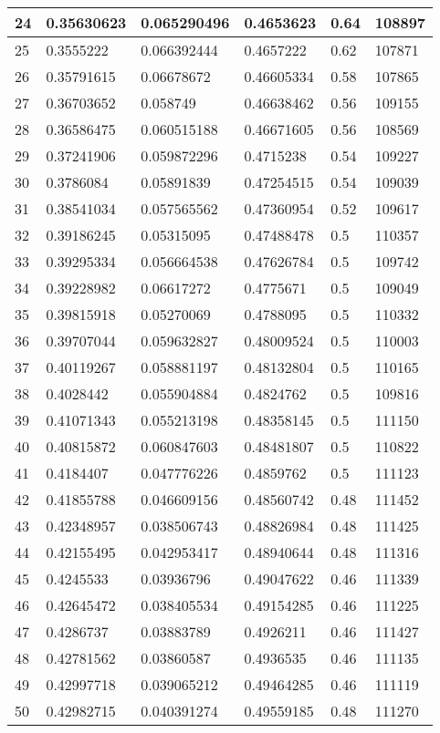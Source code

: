 \begin{longtable}{|l|l|l|l|l|l|}
24 & 0.35630623 & 0.065290496 & 0.4653623 & 0.64 & 108897 \\ \hline 
25 & 0.3555222 & 0.066392444 & 0.4657222 & 0.62 & 107871 \\ \hline 
26 & 0.35791615 & 0.06678672 & 0.46605334 & 0.58 & 107865 \\ \hline 
27 & 0.36703652 & 0.058749 & 0.46638462 & 0.56 & 109155 \\ \hline 
28 & 0.36586475 & 0.060515188 & 0.46671605 & 0.56 & 108569 \\ \hline 
29 & 0.37241906 & 0.059872296 & 0.4715238 & 0.54 & 109227 \\ \hline 
30 & 0.3786084 & 0.05891839 & 0.47254515 & 0.54 & 109039 \\ \hline 
31 & 0.38541034 & 0.057565562 & 0.47360954 & 0.52 & 109617 \\ \hline 
32 & 0.39186245 & 0.05315095 & 0.47488478 & 0.5 & 110357 \\ \hline 
33 & 0.39295334 & 0.056664538 & 0.47626784 & 0.5 & 109742 \\ \hline 
34 & 0.39228982 & 0.06617272 & 0.4775671 & 0.5 & 109049 \\ \hline 
35 & 0.39815918 & 0.05270069 & 0.4788095 & 0.5 & 110332 \\ \hline 
36 & 0.39707044 & 0.059632827 & 0.48009524 & 0.5 & 110003 \\ \hline 
37 & 0.40119267 & 0.058881197 & 0.48132804 & 0.5 & 110165 \\ \hline 
38 & 0.4028442 & 0.055904884 & 0.4824762 & 0.5 & 109816 \\ \hline 
39 & 0.41071343 & 0.055213198 & 0.48358145 & 0.5 & 111150 \\ \hline 
40 & 0.40815872 & 0.060847603 & 0.48481807 & 0.5 & 110822 \\ \hline 
41 & 0.4184407 & 0.047776226 & 0.4859762 & 0.5 & 111123 \\ \hline 
42 & 0.41855788 & 0.046609156 & 0.48560742 & 0.48 & 111452 \\ \hline 
43 & 0.42348957 & 0.038506743 & 0.48826984 & 0.48 & 111425 \\ \hline 
44 & 0.42155495 & 0.042953417 & 0.48940644 & 0.48 & 111316 \\ \hline 
45 & 0.4245533 & 0.03936796 & 0.49047622 & 0.46 & 111339 \\ \hline 
46 & 0.42645472 & 0.038405534 & 0.49154285 & 0.46 & 111225 \\ \hline 
47 & 0.4286737 & 0.03883789 & 0.4926211 & 0.46 & 111427 \\ \hline 
48 & 0.42781562 & 0.03860587 & 0.4936535 & 0.46 & 111135 \\ \hline 
49 & 0.42997718 & 0.039065212 & 0.49464285 & 0.46 & 111119 \\ \hline 
50 & 0.42982715 & 0.040391274 & 0.49559185 & 0.48 & 111270 \\ \hline 
\end{longtable}